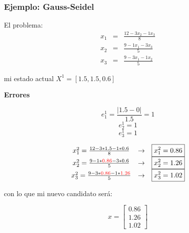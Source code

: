 \documentclass[xcolor=svgnames]{beamer} %
\theoremstyle{plain}
\renewcommand{\textbf}[1]{{\bfseries\textcolor{redUnq2}{#1}}}
\theoremstyle{definition}
\begin{document}
\begin{frame}
\frametitle{Ejemplo: Gauss-Seidel}

\begin{minipage}{.4\linewidth}
El problema:\vspace{-5pt}
$$\begin{array}{ccc}
x_1 &=& \frac{12-3x_2-1x_3}{8}\\
x_2 &=& \frac{9-1x_1-3x_3}{5}\\
x_3 &=& \frac{9-3x_1-1x_2}{5}
\end{array}$$

mi estado actual $X^1 =[1.5,1.5,0.6]$\vspace{-5pt}
\end{minipage} \vrule \begin{minipage}{.5\linewidth}
\begin{center}
  \textbf{Errores}
\end{center}
$$e_1^1 = \frac{|1.5 -0|}{1.5} = 1$$
$$e_2^1 = 1$$
$$e_3^1 = 1$$
\end{minipage}



\begin{minipage}{.65\linewidth}
\pause
$$\begin{array}{ccc}
x_1^2 = \frac{12-3*1.5-1*0.6}{8} &\rightarrow & \boxed{x_1^2 = 0.86}\\
x_2^2 = \frac{9-1*{\color{red}0.86}-3*0.6}{5} &\rightarrow & \boxed{x_2^2 = 1.26}\\
x_3^2 = \frac{9-3*{\color{red}0.86}-1*{\color{red}1.26}}{5} &\rightarrow & \boxed{x_3^2 = 1.02}
\end{array}$$

\end{minipage}\pause \vrule \begin{minipage}{.3\linewidth}
con lo que mi nuevo candidato será:

$$x = \begin{bmatrix}
0.86\\
1.26\\
1.02
\end{bmatrix}$$

\end{minipage}
\end{frame}
\end{document}
